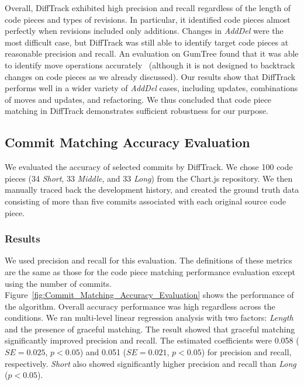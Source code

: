 Overall, DiffTrack exhibited high precision and recall regardless of the length of code pieces and types of revisions.
In particular, it identified code pieces almost perfectly when revisions included only additions.
Changes in \textit{AddDel} were the most difficult case, but DiffTrack was still able to identify target code pieces at reasonable precision and recall.
An evaluation on GumTree found that it was able to identify move operations accurately~\cite{GumTree} (although it is not designed to backtrack changes on code pieces as we already discussed).
Our results show that DiffTrack performs well in a wider variety of \textit{AddDel} cases, including updates, combinations of moves and updates, and refactoring.
We thus concluded that code piece matching in DiffTrack demonstrates sufficient robustness for our purpose.



\subsection{Commit Matching Accuracy Evaluation}
We evaluated the accuracy of selected commits by DiffTrack.
We chose  100 code pieces (34 \textit{Short}, 33 \textit{Middle}, and 33 \textit{Long}) from the Chart.js repository.
We then manually traced back the development history, and created the ground truth data consisting of more than five commits associated with each original source code piece.


\subsubsection{Results}
We used precision and recall for this evaluation.
The definitions of these metrics are the same as those for the code piece matching performance evaluation except using the number of commits.
Figure~\ref{fig:Commit_Matching_Accuracy_Evaluation} shows the performance of the algorithm.
Overall accuracy performance was high regardless across the conditions.
We ran multi-level linear regression analysis with two factors: \textit{Length} and the presence of graceful matching.
The result showed that graceful matching significantly improved precision and recall.
The estimated coefficients were 0.058 ($SE=0.025$, $p<0.05$) and 0.051 ($SE=0.021$, $p<0.05$) for precision and recall, respectively.
\textit{Short} also showed significantly higher precision and recall than \textit{Long} ($p<0.05$).


